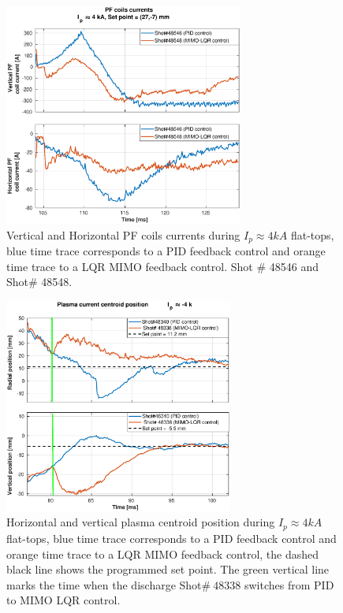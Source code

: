 \begin{figure}
	\centering
	\includegraphics[width=0.7\textwidth]{Chp5/PIDvsMIMO_546_548_curr_2.eps}
	\caption{ Vertical and Horizontal PF coils currents during  $I_p\approx 4kA$  flat-tops, blue time trace corresponds to a PID feedback control and orange time trace to a LQR MIMO feedback control.  Shot $\#$ 48546 and Shot$\#$ 48548.}
\end{figure}

\begin{figure}
	\centering
	\includegraphics[width=0.67\textwidth]{Chp5/PIDvsMIMO_340_338_2.eps}
	\caption{Horizontal and vertical plasma centroid position during  $I_p\approx 4kA$  flat-tops, blue time trace corresponds to a PID feedback control and orange time trace to a LQR MIMO feedback control, the dashed black line shows the programmed set point. The green vertical line marks the time  when the  discharge Shot$\# ~48338$ switches  from PID to MIMO LQR control.	}
\end{figure}

